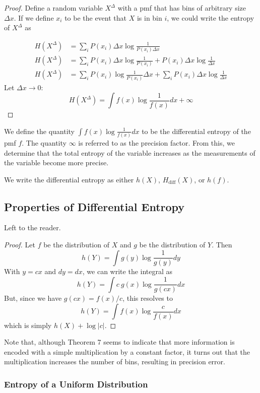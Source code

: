 \documentclass[11pt]{article}
\theoremstyle{definition}
\begin{document}
\begin{proof}

Define a random variable $X^{\Delta}$ with a pmf that has bins of arbitrary size $\Delta x$. If we define $x_i$ to be the event that $X$ is in bin $i$, we could write the entropy of $X^{\Delta}$ as 

\begin{align*}
H(X^{\Delta}) &= \sum_i P(x_i) \Delta x \log{\frac{1}{P(x_i) \Delta x}}  \\
H(X^{\Delta}) &= \sum_i P(x_i) \Delta x \log{\frac{1}{P(x_i)} } +  P(x_i) \Delta x \log{\frac{1}{\Delta x} } \\
H(X^{\Delta}) &= \sum_i P(x_i) \log{\frac{1}{P(x_i)} } \Delta x +  \sum_i P(x_i) \Delta x \log{\frac{1}{\Delta x} }
\end{align*}
Let $\Delta x \to 0$:
	$$H(X^{\Delta}) = \boxed{ \int f(x) \log{\frac{1}{f(x)}} dx} + \infty$$
	
\end{proof}
\noindent We define the quantity $\int f(x) \log{\frac{1}{f(x)}} dx$ to be the differential entropy of the pmf $f$. The quantity $\infty$ is referred to as the precision factor. From this, we determine that the total entropy of the variable increases as the measurements of the variable become more precise. 

\notation We write the differential entropy as either $h(X)$, $H_{\mathrm{diff}}(X)$, or $h(f)$. 
\subsection{Properties of Differential Entropy}
\proof Left to the reader. 
\begin{proof}
Let $f$ be the distribution of $X$ and $g$ be the distribution of $Y$. Then $$h(Y) = \int g(y) \log \frac{1}{g(y)} dy$$With $y = cx$ and $dy = dx$, we can write the integral as $$h(Y) = \int c \: g(x) \log \frac{1}{g(cx)} dx$$But, since we have $g(cx) = f(x)/c$, this resolves to $$h(Y) = \int f(x) \log \frac{c}{f(x)} dx$$which is simply $h(X) + \log |c|$.
\end{proof}

\remark Note that, although Theorem 7 seems to indicate that more information is encoded with a simple multiplication by a constant factor, it turns out that the multiplication increases the number of bins, resulting in precision error. 

\subsubsection{Entropy of a Uniform Distribution}
\end{document}
